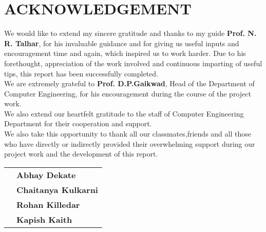 \chapter*{\Huge\textbf{ACKNOWLEDGEMENT}}

 We would like to extend my sincere gratitude and thanks to my guide \textbf{Prof. N. R. Talhar}, for his invaluable guidance and for giving us useful inputs and encouragement time and again, which inspired us to work harder.  Due to his forethought, appreciation of the work involved and continuous imparting of useful tips, this report has been successfully completed.\\

\noindent
We are extremely grateful to \textbf{Prof. D.P.Gaikwad}, Head of the Department of Computer Engineering, for his  encouragement during the course of the project work.\\   

\noindent
We also extend our heartfelt gratitude to the staff of Computer Engineering Department for their cooperation and support. \\

\noindent
We also take this opportunity to thank all our classmates,friends and all those who have directly or indirectly provided their overwhelming support during  our project work and the development of this report.\\






\vspace{0.5in}
\begin{tabular}{ll}
 & \hspace{3.5in} \bf Abhay Dekate\\
 & \hspace{3.5in} \bf Chaitanya Kulkarni\\
 & \hspace{3.5in} \bf Rohan Killedar\\
 & \hspace{3.5in} \bf Kapish Kaith\\
\end{tabular}